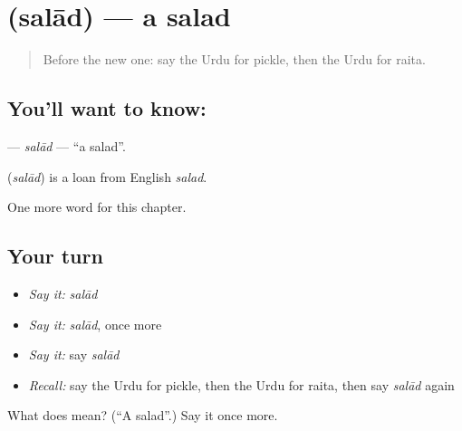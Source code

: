 \section[\texorpdfstring{\ur{سلاد} (salād)}{سلاد (salād)}]{ (salād) — a salad}

\label{lesson:UR-C200-salad}



\begin{quote}
Before the new one: say the Urdu for pickle, then the Urdu for raita.
\end{quote}

\subsection*{You'll want to know: }
\textbf{} — \emph{salād} — \textquotedblleft{}a salad\textquotedblright{}.

\begin{cousinweb}
\textbf{} (\emph{salād}) is a loan from English \emph{salad}.
\end{cousinweb}

\begin{grammarlens}[title={What you've built}]
One more word for this chapter.
\end{grammarlens}

\subsection*{Your turn}
\begin{itemize}
\raggedright
  \item \emph{Say it:} \emph{salād}
  \item \emph{Say it:} \emph{salād}, once more
  \item \emph{Say it:} say \emph{salād}
  \item \emph{Recall:} say the Urdu for pickle, then the Urdu for raita, then say \emph{salād} again
\end{itemize}

\begin{tcolorbox}[breakable,colback=teal!4,colframe=teal!35!black,title={Before you move on}]
What does  mean? (\textquotedblleft{}A salad\textquotedblright{}.) Say it once more.
\end{tcolorbox}
